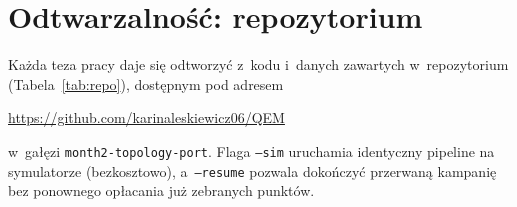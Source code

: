 \documentclass[11pt]{article}
\begin{document}
\appendix
\section{Odtwarzalność: repozytorium}\label{sec:odtwarzalnosc}

Każda teza pracy daje się odtworzyć z~kodu i~danych zawartych w~repozytorium
(Tabela~\ref{tab:repo}), dostępnym pod adresem
\begin{center}\url{https://github.com/karinaleskiewicz06/QEM}\end{center}
w~gałęzi \texttt{month2-topology-port}. Flaga \texttt{--sim}
uruchamia identyczny pipeline na symulatorze (bezkosztowo), a~\texttt{--resume} pozwala dokończyć
przerwaną kampanię bez ponownego opłacania już zebranych punktów.
\end{document}
